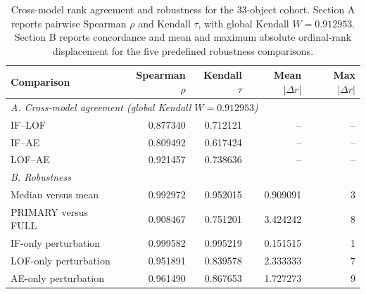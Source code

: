 \begin{table}
\caption{Cross-model rank agreement and robustness for the 33-object cohort. Section A reports pairwise Spearman $\rho$ and Kendall $\tau$, with global Kendall $W=0.912953$. Section B reports concordance and mean and maximum absolute ordinal-rank displacement for the five predefined robustness comparisons.}
\begin{tabular}{lrrrr}
\hline
Comparison & Spearman $\rho$ & Kendall $\tau$ & Mean $|\Delta r|$ & Max $|\Delta r|$ \\
\hline
\multicolumn{5}{l}{\textit{A. Cross-model agreement (global Kendall $W=0.912953$)}}\\
IF--LOF & 0.877340 & 0.712121 & -- & -- \\
IF--AE & 0.809492 & 0.617424 & -- & -- \\
LOF--AE & 0.921457 & 0.738636 & -- & -- \\
\multicolumn{5}{l}{\textit{B. Robustness}}\\
Median versus mean & 0.992972 & 0.952015 & 0.909091 & 3 \\
PRIMARY versus FULL & 0.908467 & 0.751201 & 3.424242 & 8 \\
IF-only perturbation & 0.999582 & 0.995219 & 0.151515 & 1 \\
LOF-only perturbation & 0.951891 & 0.839578 & 2.333333 & 7 \\
AE-only perturbation & 0.961490 & 0.867653 & 1.727273 & 9 \\
\hline
\end{tabular}
\end{table}
